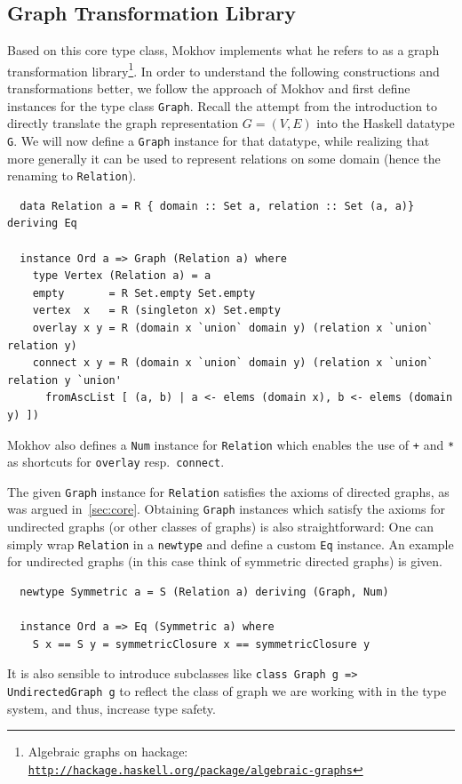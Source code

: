 \documentclass{article}
\newcommand{\hs}{\texttt}
\begin{document}
\subsection{Graph Transformation Library}\label{sec:trafo}
Based on this core type class, Mokhov implements what he refers to as a graph
transformation library\footnote{Algebraic graphs on hackage:
  \texttt{\href{http://hackage.haskell.org/package/algebraic-graphs}{http://hackage.haskell.org/package/algebraic-graphs}}}.
In order to understand the following constructions and transformations better,
we follow the approach of Mokhov and first define instances for the type class
\hs{Graph}. Recall the attempt from the introduction to directly translate the
graph representation $G=(V,E)$ into the Haskell datatype \hs{G}. We will now
define a \hs{Graph} instance for that datatype, while realizing that more
generally it can be used to represent relations on some domain (hence the renaming
to \hs{Relation}).
\begin{verbatim}
  data Relation a = R { domain :: Set a, relation :: Set (a, a)} deriving Eq

  instance Ord a => Graph (Relation a) where
    type Vertex (Relation a) = a
    empty       = R Set.empty Set.empty
    vertex  x   = R (singleton x) Set.empty
    overlay x y = R (domain x `union` domain y) (relation x `union` relation y)
    connect x y = R (domain x `union` domain y) (relation x `union` relation y `union'
      fromAscList [ (a, b) | a <- elems (domain x), b <- elems (domain y) ])
\end{verbatim}
Mokhov also defines a \hs{Num} instance for \hs{Relation} which enables the use
of \hs{+} and \hs{*} as shortcuts for \hs{overlay} resp.\ \hs{connect}.

The given \hs{Graph} instance for \hs{Relation} satisfies the axioms of directed
graphs, as was argued in~\autoref{sec:core}. Obtaining \hs{Graph} instances
which satisfy the axioms for undirected graphs (or other classes of graphs) is
also straightforward: One can simply wrap \hs{Relation} in a \hs{newtype} and
define a custom \hs{Eq} instance. An example for undirected graphs (in this case
think of symmetric directed graphs) is given.
\begin{verbatim}
  newtype Symmetric a = S (Relation a) deriving (Graph, Num)

  instance Ord a => Eq (Symmetric a) where
    S x == S y = symmetricClosure x == symmetricClosure y
\end{verbatim}
It is also sensible to introduce subclasses like \hs{class Graph g => UndirectedGraph g}
to reflect the class of graph we are working with in the type system, and thus,
increase type safety.
\end{document}
